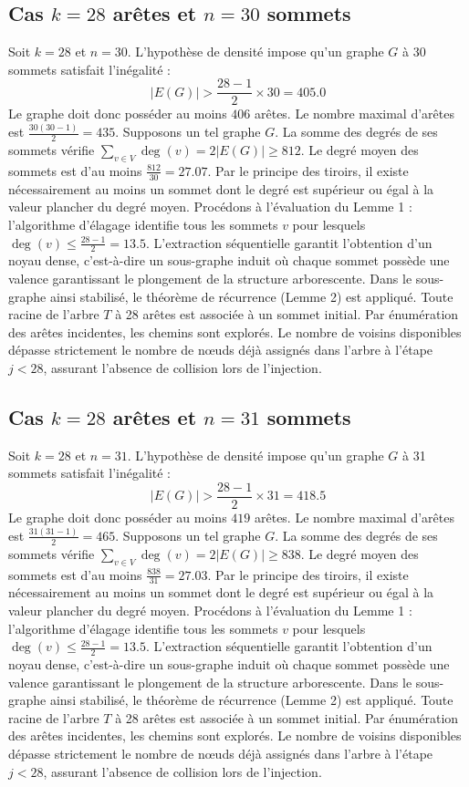\documentclass[12pt,a4paper]{article}
\begin{document}
\subsection{Cas $k = 28$ arêtes et $n = 30$ sommets}
Soit $k = 28$ et $n = 30$. L'hypothèse de densité impose qu'un graphe $G$ à 30 sommets satisfait l'inégalité :
$$ |E(G)| > \frac{28-1}{2} \times 30 = 405.0 $$
Le graphe doit donc posséder au moins $406$ arêtes. Le nombre maximal d'arêtes est $\frac{30(30-1)}{2} = 435$.
Supposons un tel graphe $G$. La somme des degrés de ses sommets vérifie $\sum_{v \in V} \deg(v) = 2|E(G)| \geq 812$.
Le degré moyen des sommets est d'au moins $\frac{812}{30} = 27.07$.
Par le principe des tiroirs, il existe nécessairement au moins un sommet dont le degré est supérieur ou égal à la valeur plancher du degré moyen.
Procédons à l'évaluation du Lemme 1 : l'algorithme d'élagage identifie tous les sommets $v$ pour lesquels $\deg(v) \leq \frac{28-1}{2} = 13.5$.
L'extraction séquentielle garantit l'obtention d'un noyau dense, c'est-à-dire un sous-graphe induit où chaque sommet possède une valence garantissant le plongement de la structure arborescente.
Dans le sous-graphe ainsi stabilisé, le théorème de récurrence (Lemme 2) est appliqué. Toute racine de l'arbre $T$ à 28 arêtes est associée à un sommet initial. Par énumération des arêtes incidentes, les chemins sont explorés. Le nombre de voisins disponibles dépasse strictement le nombre de nœuds déjà assignés dans l'arbre à l'étape $j < 28$, assurant l'absence de collision lors de l'injection.

\subsection{Cas $k = 28$ arêtes et $n = 31$ sommets}
Soit $k = 28$ et $n = 31$. L'hypothèse de densité impose qu'un graphe $G$ à 31 sommets satisfait l'inégalité :
$$ |E(G)| > \frac{28-1}{2} \times 31 = 418.5 $$
Le graphe doit donc posséder au moins $419$ arêtes. Le nombre maximal d'arêtes est $\frac{31(31-1)}{2} = 465$.
Supposons un tel graphe $G$. La somme des degrés de ses sommets vérifie $\sum_{v \in V} \deg(v) = 2|E(G)| \geq 838$.
Le degré moyen des sommets est d'au moins $\frac{838}{31} = 27.03$.
Par le principe des tiroirs, il existe nécessairement au moins un sommet dont le degré est supérieur ou égal à la valeur plancher du degré moyen.
Procédons à l'évaluation du Lemme 1 : l'algorithme d'élagage identifie tous les sommets $v$ pour lesquels $\deg(v) \leq \frac{28-1}{2} = 13.5$.
L'extraction séquentielle garantit l'obtention d'un noyau dense, c'est-à-dire un sous-graphe induit où chaque sommet possède une valence garantissant le plongement de la structure arborescente.
Dans le sous-graphe ainsi stabilisé, le théorème de récurrence (Lemme 2) est appliqué. Toute racine de l'arbre $T$ à 28 arêtes est associée à un sommet initial. Par énumération des arêtes incidentes, les chemins sont explorés. Le nombre de voisins disponibles dépasse strictement le nombre de nœuds déjà assignés dans l'arbre à l'étape $j < 28$, assurant l'absence de collision lors de l'injection.
\end{document}
